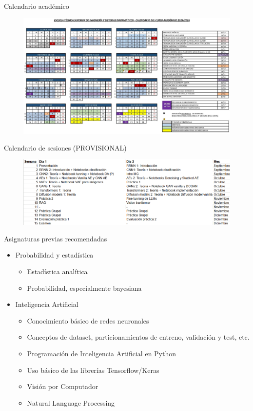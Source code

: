\begin{frame}{Calendario académico}
\begin{figure}
    \centering
    \includegraphics[width=\textwidth]{Slides/figures/Presentacion/Calendario_Academico.png}
\end{figure}
\end{frame}

\begin{frame}{Calendario de sesiones (PROVISIONAL)}
\begin{figure}
    \centering
    \includegraphics[width=\textwidth]{Slides/figures/Presentacion/Sesiones.png}
\end{figure}
\end{frame}

\begin{frame}{Asignaturas previas recomendadas}
\begin{itemize}
    \item \alert{Probabilidad y estadística}
    \begin{itemize}
        \item Estadística analítica
        \item Probabilidad, especialmente bayesiana
    \end{itemize}
    \item \alert{Inteligencia Artificial}
    \begin{itemize}
        \item Conocimiento básico de redes neuronales
        \item Conceptos de dataset, particionamientos de entreno, validación y test, etc.
        \item Programación de Inteligencia Artificial en Python
        \item Uso básico de las librerías Tensorflow/Keras
        \item Visión por Computador
        \item Natural Language Processing
    \end{itemize}
\end{itemize}
\end{frame}

